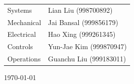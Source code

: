 \begin{titlepage}
\begin{centering} \large
\begin{tabular}{ll}
Systems	&	Lian Liu (998700892)		\\
Mechanical	&	Jai Bansal (999856179)	\\
Electrical	& 	Hao Xing (999261345)	\\
Controls	&	Yun-Jae Kim (999870947)	\\
Operations	&	Guanchu Liu (999183011)	\\[1cm]
\end{tabular}
\end{centering}




{\large \today}\\[3cm] %
 

\vfill %

\end{titlepage}

